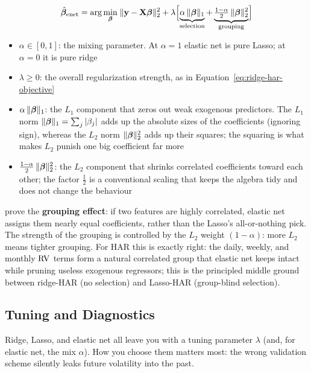 \begin{equation}
  \hat{\bm{\beta}}_{\mathrm{enet}} = \arg\min_{\bm{\beta}}\;
  \lVert \mathbf{y} - \mathbf{X}\bm{\beta} \rVert_2^2
  + \lambda\Bigl[\underbrace{\alpha\,\lVert\bm{\beta}\rVert_1}_{\text{selection}}
  + \underbrace{\tfrac{1-\alpha}{2}\,\lVert\bm{\beta}\rVert_2^2}_{\text{grouping}}\Bigr]
  \label{eq:elastic-net-har}
\end{equation}
\begin{itemize}[nosep]
  \item $\alpha \in [0,1]$: the mixing parameter. At $\alpha = 1$ elastic net is pure Lasso; at $\alpha = 0$ it is pure ridge
  \item $\lambda \geq 0$: the overall regularization strength, as in Equation~\eqref{eq:ridge-har-objective}
  \item $\alpha\,\lVert\bm{\beta}\rVert_1$: the $L_1$ component that zeros out weak exogenous predictors. The $L_1$ norm $\lVert\bm{\beta}\rVert_1 = \sum_j|\beta_j|$ adds up the absolute sizes of the coefficients (ignoring sign), whereas the $L_2$ norm $\lVert\bm{\beta}\rVert_2^2$ adds up their squares; the squaring is what makes $L_2$ punish one big coefficient far more
  \item $\tfrac{1-\alpha}{2}\,\lVert\bm{\beta}\rVert_2^2$: the $L_2$ component that shrinks correlated coefficients toward each other; the factor $\tfrac{1}{2}$ is a conventional scaling that keeps the algebra tidy and does not change the behaviour
\end{itemize}

\begin{keyidea}
\citet{ZouHastie2005} prove the \textbf{grouping effect}: if two features are highly correlated, elastic net assigns them nearly equal coefficients, rather than the Lasso's all-or-nothing pick.
The strength of the grouping is controlled by the $L_2$ weight $(1-\alpha)$: more $L_2$ means tighter grouping.
For HAR this is exactly right: the daily, weekly, and monthly $\operatorname{RV}$ terms form a natural correlated group that elastic net keeps intact while pruning useless exogenous regressors; this is the principled middle ground between ridge-HAR (no selection) and Lasso-HAR (group-blind selection).
\end{keyidea}

\subsection{Tuning and Diagnostics}

Ridge, Lasso, and elastic net all leave you with a tuning parameter $\lambda$ (and, for elastic net, the mix $\alpha$).
How you choose them matters most: the wrong validation scheme silently leaks future volatility into the past.


